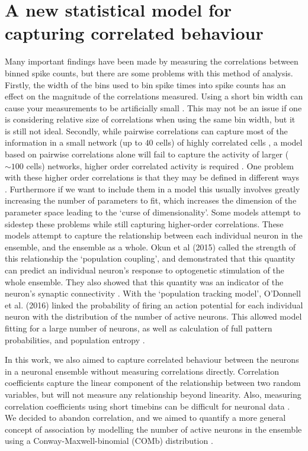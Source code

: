 \section{A new statistical model for capturing correlated behaviour}

Many important findings have been made by measuring the correlations between binned spike counts, but there are some problems with this method of analysis. Firstly, the width of the bins used to bin spike times into spike counts has an effect on the magnitude of the correlations measured. Using a short bin width can cause your measurements to be artificially small \parencite{cohen2}. This may not be an issue if one is considering relative size of correlations when using the same bin width, but it is still not ideal. Secondly, while pairwise correlations can capture most of the information in a small network (up to $40$ cells) of highly correlated cells \parencite{schneidman}, a model based on pairwise correlations alone will fail to capture the activity of larger ($\sim 100$ cells) networks, higher order correlated activity is required \parencite{ganmor}. One problem with these higher order correlations is that they may be defined in different ways \parencite{staude}. Furthermore if we want to include them in a model this usually involves greatly increasing the number of parameters to fit, which increases the dimension of the parameter space leading to the `curse of dimensionality'.
Some models attempt to sidestep these problems while still capturing higher-order correlations. These models attempt to capture the relationship between each individual neuron in the ensemble, and the ensemble as a whole. Okun et al (2015) called the strength of this relationship the `population coupling', and demonstrated that this quantity can predict an individual neuron's response to optogenetic stimulation of the whole ensemble. They also showed that this quantity was an indicator of the neuron's synaptic connectivity \parencite{okun}. With the `population tracking model', O'Donnell et al. (2016) linked the probability of firing an action potential for each individual neuron with the distribution of the number of active neurons. This allowed model fitting for a large number of neurons, as well as calculation of full pattern probabilities, and population entropy \parencite{odonnell}.

In this work, we also aimed to capture correlated behaviour between the neurons in a neuronal ensemble without measuring correlations directly. Correlation coefficients capture the linear component of the relationship between two random variables, but will not measure any relationship beyond linearity. Also, measuring correlation coefficients using short timebins can be difficult for neuronal data \parencite{cohen2}. We decided to abandon correlation, and we aimed to quantify a more general concept of association by modelling the number of active neurons in the ensemble using a Conway-Maxwell-binomial (COMb) distribution \parencite{kadane_2016}.

